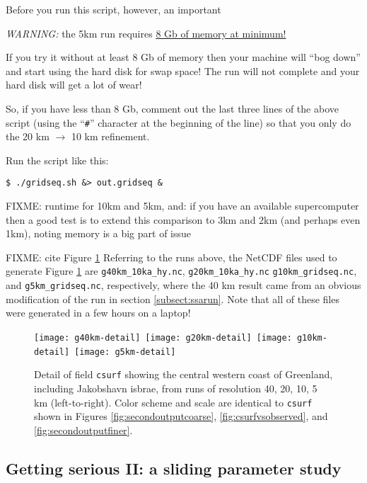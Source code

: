 Before you run this script, however, an important

\medskip
\centerline{\large\emph{WARNING:} the 5km run requires \underline{8 Gb of memory at minimum!}\normalsize}

\medskip
\noindent If you try it without at least 8 Gb of memory then your machine will ``bog down'' and start using the hard disk for swap space!  The run will not complete and your hard disk will get a lot of wear!

So, if you have less than 8 Gb, comment out the last three lines of the above script (using the ``\verb|#|'' character at the beginning of the line) so that you only do the 20 km $\to$ 10 km refinement.

Run the script like this:
\begin{verbatim}
$ ./gridseq.sh &> out.gridseq &
\end{verbatim}

FIXME:  runtime for 10km and 5km, and: if you have an available supercomputer then a good test is to extend this comparison to 3km and 2km (and perhaps even 1km), noting memory is a big part of issue


FIXME:  cite Figure \ref{fig:gridseqdetail}  Referring to the runs above, the NetCDF files used to generate Figure \ref{fig:gridseqdetail} are \texttt{g40km_10ka_hy.nc}, \texttt{g20km_10ka_hy.nc} \texttt{g10km_gridseq.nc}, and \texttt{g5km_gridseq.nc}, respectively, where the 40 km result came from an obvious modification of the run in section \ref{subsect:ssarun}.  Note that all of these files were generated in a few hours on a laptop!

\begin{figure}[ht]
\centering
\mbox{\texttt{[image: g40km-detail]} \texttt{[image: g20km-detail]} \texttt{[image: g10km-detail]} \texttt{[image: g5km-detail]} }
\caption{Detail of field \texttt{csurf} showing the central western coast of Greenland, including Jakobshavn isbrae, from runs of resolution 40, 20, 10, 5 km (left-to-right).  Color scheme and scale are identical to \texttt{csurf} shown in Figures \ref{fig:secondoutputcoarse}, \ref{fig:csurfvsobserved}, and \ref{fig:secondoutputfiner}.}
\label{fig:gridseqdetail}
\end{figure}


\subsection{Getting serious II: a sliding parameter study}  \label{subsect:paramstudy}

